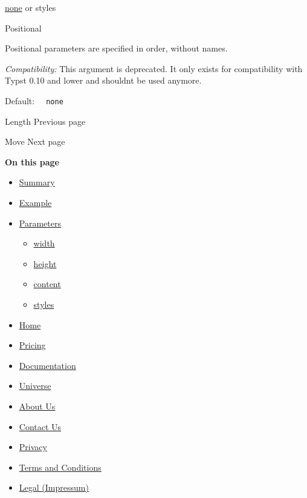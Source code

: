 \href{/docs/reference/foundations/none/}{none} {or} { styles }

{{ Positional }}

\label{parameters-styles-positional-tooltip}
Positional parameters are specified in order, without names.

\emph{Compatibility:} This argument is deprecated. It only exists for
compatibility with Typst 0.10 and lower and shouldn\textquotesingle t be
used anymore.

Default: \texttt{\ }{\texttt{\ none\ }}\texttt{\ }

\href{/docs/reference/layout/length/}{\pandocbounded{}}

{ Length } { Previous page }

\href{/docs/reference/layout/move/}{\pandocbounded{}}

{ Move } { Next page }

\textbf{On this page}

\begin{itemize}
\tightlist
\item
  \hyperref[summary]{Summary}
\item
  \hyperref[example]{Example}
\item
  \hyperref[parameters]{Parameters}

  \begin{itemize}
  \tightlist
  \item
    \hyperref[parameters-width]{width}
  \item
    \hyperref[parameters-height]{height}
  \item
    \hyperref[parameters-content]{content}
  \item
    \hyperref[parameters-styles]{styles}
  \end{itemize}
\end{itemize}

\begin{itemize}
\tightlist
\item
  \href{/}{Home}
\item
  \href{/pricing/}{Pricing}
\item
  \href{/docs/}{Documentation}
\item
  \href{/universe/}{Universe}
\item
  \href{/about/}{About Us}
\item
  \href{/contact/}{Contact Us}
\item
  \href{/privacy/}{Privacy}
\item
  \href{https://typst.app/terms}{Terms and Conditions}
\item
  \href{/legal/}{Legal (Impressum)}
\end{itemize}

